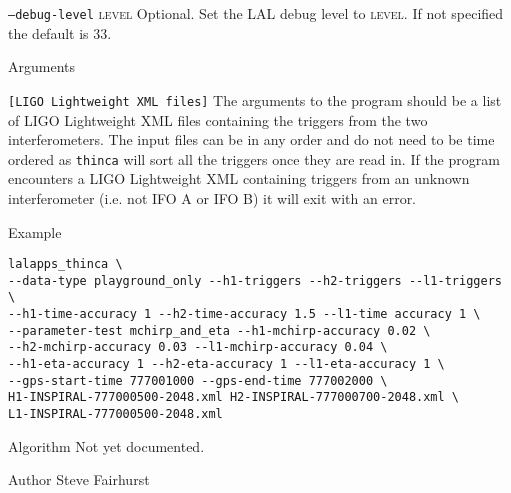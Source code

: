 \begin{entry}
\begin{entry}
\item[\texttt{--debug-level} \textsc{level}] Optional. Set the LAL debug
level to \textsc{level}. If not specified the default is 33.

\end{entry}

\item[Arguments]\leavevmode
\begin{entry}
\item[\texttt{[LIGO Lightweight XML files]}] The arguments to the program
should be a list of LIGO Lightweight XML files containing the triggers from
the two interferometers. The input files can be in any order and do not need
to be time ordered as \texttt{thinca} will sort all the triggers once they are
read in. If the program encounters a LIGO Lightweight XML containing triggers
from an unknown interferometer (i.e. not IFO A or IFO B) it will exit with an
error.
\end{entry}

\item[Example]
\begin{verbatim}
lalapps_thinca \
--data-type playground_only --h1-triggers --h2-triggers --l1-triggers \
--h1-time-accuracy 1 --h2-time-accuracy 1.5 --l1-time accuracy 1 \
--parameter-test mchirp_and_eta --h1-mchirp-accuracy 0.02 \
--h2-mchirp-accuracy 0.03 --l1-mchirp-accuracy 0.04 \ 
--h1-eta-accuracy 1 --h2-eta-accuracy 1 --l1-eta-accuracy 1 \
--gps-start-time 777001000 --gps-end-time 777002000 \
H1-INSPIRAL-777000500-2048.xml H2-INSPIRAL-777000700-2048.xml \
L1-INSPIRAL-777000500-2048.xml
\end{verbatim}

\item[Algorithm]
Not yet documented.


\item[Author] 
Steve Fairhurst
\end{entry}


